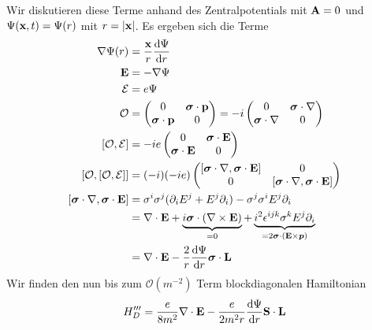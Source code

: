 \documentclass[11pt,a4paper]{report}
\renewcommand{\vec}{\boldsymbol}
\begin{document}
Wir diskutieren diese Terme anhand des Zentralpotentials mit $\mathbf{A} = 0$ und $\Psi(\mathbf{x}, t) = \Psi(r)$ mit $r = |\mathbf{x}|$.
Es ergeben sich die Terme
\begin{align*}
    \nabla \Psi (r) &= \frac{\vf{x}}{r} \frac{\mathrm{d} \Psi}{\mathrm{d} r} \\
    \vf{E} &= - \nabla \Psi \\
    \mathcal{E} &= e \Psi \\
    \mathcal{O} &= \begin{pmatrix}
        0 & \vec{\sigma} \cdot\vf{p} \\ \vec{\sigma}\cdot\vf{p} & 0 \\
    \end{pmatrix} = -i \begin{pmatrix}
        0 & \vec{\sigma}\cdot\nabla \\ \vec{\sigma}\cdot \nabla & 0 \\
    \end{pmatrix} \\
    [\mathcal{O}, \mathcal{E}] &= -i e \begin{pmatrix}
        0 & \vec{\sigma}\cdot \vf{E} \\ \vec{\sigma}\cdot \vf{E} & 0 \\
    \end{pmatrix} \\
    [\mathcal{O}, [\mathcal{O}, \mathcal{E}]] &= (-i) (-i e) \begin{pmatrix}
        [\vec{\sigma}\cdot \nabla, \vec{\sigma}\cdot \vf{E}] & 0 \\ 0 & [\vec{\sigma}\cdot \nabla, \vec{\sigma}\cdot \vf{E}] \\
    \end{pmatrix}  \\
    [\vec{\sigma}\cdot \nabla, \vec{\sigma}\cdot \vf{E}]  &= \sigma^i \sigma^j (\partial_i E^j + E^j \partial_i) - \sigma^j \sigma^i E^j \partial_i \\
    &= \nabla\cdot \vf{E} + \underbrace{i \vec{\sigma}\cdot (\nabla \times \vf{E})}_{= 0} 
    + \underbrace{i^2 \epsilon^{i j k} \sigma^k E^j \partial_i}_{=2 \vec{\sigma}\cdot (\vf{E} \times \vec{p})} \\
    &= \nabla\cdot\vf{E} - \frac{2}{r} \frac{\mathrm{d}\Psi}{\mathrm{d}r} \vec{\sigma}\cdot \vf{L}
\end{align*}
Wir finden den nun bis zum $\mathcal{O}(m^{-2})$ Term blockdiagonalen Hamiltonian
$$H_D''' = \frac{e}{8 m^2} \nabla\cdot\mathbf{E} - \frac{e}{2 m^2 r} \frac{\mathrm{d} \Psi}{\mathrm{d}r} \mathbf{S}\cdot \mathbf{L}$$
\end{document}
